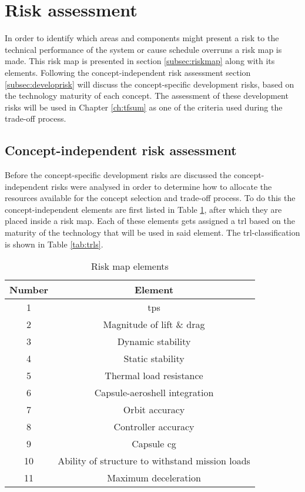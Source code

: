 \section{Risk assessment}
\label{ch:riskestimation}
In order to identify which areas and components might present a risk to the technical performance of the system or cause schedule overruns a risk map is made. This risk map is presented in section \ref{subsec:riskmap} along with its elements. Following the concept-independent risk assessment section \ref{subsec:developrisk} will discuss the concept-specific development risks, based on the technology maturity of each concept. The assessment of these development risks will be used in Chapter \ref{ch:tfsum} as one of the criteria used during the trade-off process.

\subsection{Concept-independent risk assessment}
Before the concept-specific development risks are discussed the concept-independent risks were analysed in order to determine how to allocate the resources available for the concept selection and trade-off process. To do this the concept-independent elements are first listed in Table \ref{tab:riskmapelements}, after which they are placed inside a risk map. Each of these elements gets assigned a \acrfull{trl} \cite{NASA2007} based on the maturity of the technology that will be used in said element. The \gls{trl}-classification is shown in Table \ref{tab:trls}.
\begin{table}[h]
	\centering
	\caption{Risk map elements}
	\label{tab:riskmapelements}
	\begin{tabular}{|c|c|}
		\hline 
		\textbf{Number} & \textbf{Element} \\ \hline \hline
		1 & \acrlong{tps} \\
		2 & Magnitude of lift \& drag\\
		3 & Dynamic stability\\
		4 & Static stability\\
		5 & Thermal load resistance\\
		6 & Capsule-aeroshell integration\\
		7 & Orbit accuracy\\
		8 & Controller accuracy\\
		9 & Capsule \acrlong{cg}\\
		10 & Ability of structure to withstand mission loads\\
		11 & Maximum deceleration\\
		\hline
	\end{tabular}
\end{table}

